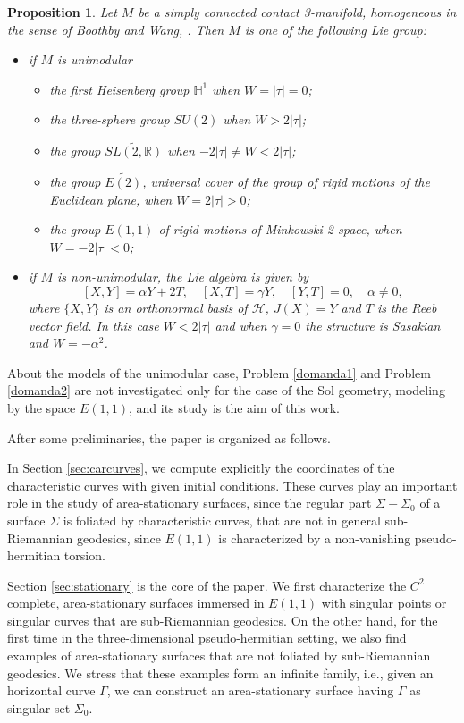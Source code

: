 \documentclass[10pt]{amsart}
\newtheorem{proposition}[theorem]{Proposition}
\theoremstyle{definition}
\theoremstyle{remark}
\numberwithin{equation}{section}
\begin{document}
\begin{proposition}\label{classification} Let  $M$ be a simply connected contact 3-manifold, homogeneous in the sense of Boothby and Wang, \cite{MR0112160}. Then $M$ is one of the following Lie group:
	\begin{itemize}
	\item [(1)] if $M$ is unimodular 
	         \begin{itemize}
	         \item the first Heisenberg group $\mathbb{H}^1$ when $W=|\tau|=0$;
	         \item the three-sphere group $SU(2)$ when $W> 2|\tau|$;
	         \item the group $\widetilde{SL(2,\mathbb{R})}$ when $-2|\tau|\neq W<2|\tau|$;
	         \item the group $\widetilde{E(2)}$, universal cover of the group of rigid motions of the Euclidean plane, when $W=2|\tau|>0$;
	         \item the group $E(1,1)$ of rigid motions of Minkowski 2-space, when $W=-2|\tau|<0$;
	         \end{itemize}
	\item [(2)] if $M$ is non-unimodular, the Lie algebra is given by
	        \[
	        [X,Y]=\alpha Y+2T ,\quad  [X,T]=\gamma Y, \quad  [Y,T]=0, \quad \alpha\neq 0,
	        \]
	        where $\{X,Y\}$ is an orthonormal basis of ${\mathcal{H}}$, $J(X)=Y$ and $T$ is the Reeb vector field. In this case $W<2|\tau|$ and when $\gamma=0$ the structure is Sasakian and $W=-\alpha^2$.
	\end{itemize}
\end{proposition}

About the models of the unimodular case, Problem \ref{domanda1} and Problem \ref{domanda2} are not investigated only for the case of the Sol geometry, modeling by the space ${E(1,1)}$, and its study is the aim of this work. 

After some preliminaries, the paper is organized as follows. 

In Section \ref{sec:carcurves}, we compute explicitly the coordinates of the characteristic curves with given initial conditions. These curves play an important role in the study of area-stationary surfaces, since the regular part ${\Sigma}-{\Sigma}_0$ of a surface ${\Sigma}$ is foliated by characteristic curves, that are not in general sub-Riemannian geodesics, since ${E(1,1)}$ is characterized by a non-vanishing pseudo-hermitian torsion. 

Section \ref{sec:stationary} is the core of the paper. We first characterize the $C^2$ complete, area-stationary surfaces immersed in ${E(1,1)}$ with singular points or singular curves that are sub-Riemannian geodesics. On the other hand, for the first time in the three-dimensional pseudo-hermitian setting, we also find examples of area-stationary surfaces that are not foliated by sub-Riemannian geodesics. We stress that these examples form an infinite family, i.e., given an horizontal curve ${\Gamma}$, we can construct an area-stationary surface having ${\Gamma}$ as singular set ${\Sigma}_0$. 
\end{document}
